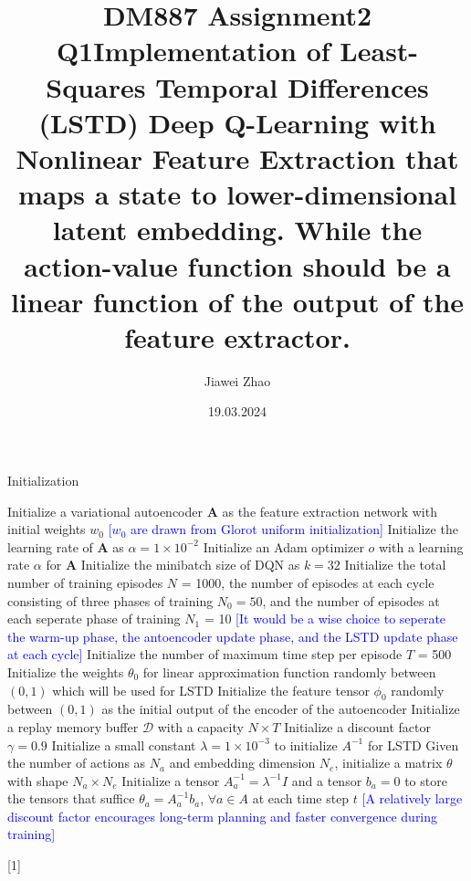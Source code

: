 \documentclass[a4paper,12pt,oneside]{article}
\numberwithin{equation}{section}
\begin{document}
\title{DM887 Assignment2 Q1}
\author{Jiawei Zhao}
\date{19.03.2024}
\maketitle
\title {Implementation of Least-Squares Temporal Differences (LSTD) Deep Q-Learning with Nonlinear Feature Extraction that maps a state to lower-dimensional latent embedding. While the action-value function should be a linear function of the output of the feature extractor.}

\newcommand{\mycomment}[1]{{\fontfamily{lmss}\selectfont\textcolor{blue}{[#1]}}} %
    \begin{algorithm}
        \begin{algorithmic}[1]
        \caption{Initialization}
        \State Initialize a variational autoencoder $\mathbf{A}$ as the feature extraction network with initial weights \(w_0\)
        \mycomment {\(w_0\) are drawn from Glorot uniform initialization}
        \State Initialize the learning rate of $\mathbf{A}$ as $\alpha=1 \times 10^{-2}$ 
        \State Initialize an Adam optimizer \(o\) with a learning rate $\alpha$ for $\mathbf{A}$
        \State Initialize the minibatch size of DQN as \(k=32\) 
        \State Initialize the total number of training episodes \(N\) = 1000, the number of episodes at each cycle consisting of three phases of training $N_0=50$, and the number of episodes at each seperate phase of training \(N_1\) = 10 
        \mycomment {It would be a wise choice to seperate the warm-up phase, the antoencoder update phase, and the LSTD update phase at each cycle}
        \State Initialize the number of maximum time step per episode \(T\) = 500
        \State Initialize the weights $\theta_0$ for linear approximation function randomly between $(0, 1)$ which will be used for LSTD
        \State Initialize the feature tensor $\phi_0$ randomly between $(0, 1)$ as the initial output of the encoder of the autoencoder
        \State Initialize a replay memory buffer $\mathcal{D}$ with a capacity \(N \times T\)
        \State Initialize a discount factor $\gamma=0.9$ 
        \State Initialize a small constant $\lambda=1 \times 10^{-3}$ to initialize $A^{-1}$ for LSTD
        \State Given the number of actions as \(N_a\) and embedding dimension \(N_e\), initialize a matrix $\theta$ with shape $N_a \times N_e$
        \State Initialize a tensor $A_a^{-1} = \lambda^{-1}I$ and a tensor $b_a=0$ to store the tensors that suffice $\theta_{a} = A_a^{-1} b_a$, $\forall a \in A$ at each time step $t$
        \mycomment{A relatively large discount factor encourages long-term planning and faster convergence during training}
        \end{algorithmic}[1]
    \end{algorithm}
        
\end{document}

